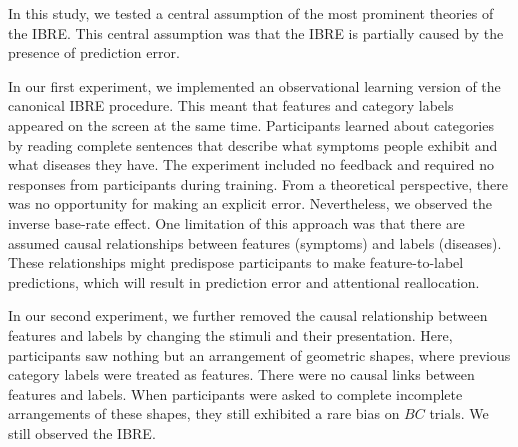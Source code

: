 \documentclass[10pt,letterpaper]{article}
\begin{document}
In this study, we tested a central assumption of the most prominent theories of the IBRE.
This central assumption was that the IBRE is partially caused by the presence of prediction error.

In our first experiment, we implemented an observational learning version of the canonical IBRE procedure.
This meant that features and category labels appeared on the screen at the same time.
Participants learned about categories by reading complete sentences that describe what symptoms people exhibit and what diseases they have.
The experiment included no feedback and required no responses from participants during training.
From a theoretical perspective, there was no opportunity for making an explicit error.
Nevertheless, we observed the inverse base-rate effect.
One limitation of this approach was that there are assumed causal relationships between features (symptoms) and labels (diseases).
These relationships might predispose participants to make feature-to-label predictions, which will result in prediction error and attentional reallocation.

In our second experiment, we further removed the causal relationship between features and labels by changing the stimuli and their presentation.
Here, participants saw nothing but an arrangement of geometric shapes, where previous category labels were treated as features.
There were no causal links between features and labels.
When participants were asked to complete incomplete arrangements of these shapes, they still exhibited a rare bias on $BC$ trials.
We still observed the IBRE.

\end{document}
